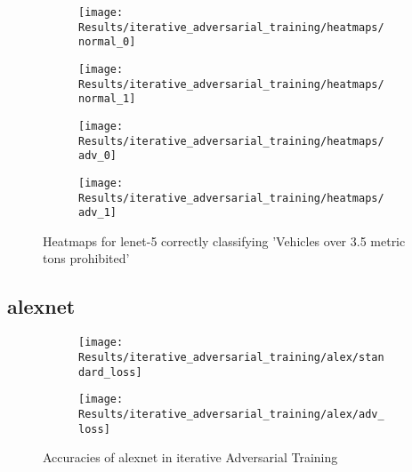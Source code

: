 \documentclass[draft,final]{vutinfth} %
\begin{document}
\begin{figure}[h]
	\begin{subfigure}[b]{0.5\columnwidth}
		\centering
    \texttt{[image: Results/iterative\_adversarial\_training/heatmaps/normal\_0]}
    \label{fig:exp:iat:lenet-5-heat:normal_0}
  \end{subfigure}
  \begin{subfigure}[b]{0.5\columnwidth}
		\centering
    \texttt{[image: Results/iterative\_adversarial\_training/heatmaps/normal\_1]}
    \label{fig:exp:iat:lenet-5-heat:normal_1}
  \end{subfigure}

	\begin{subfigure}[b]{0.5\columnwidth}
		\centering
    \texttt{[image: Results/iterative\_adversarial\_training/heatmaps/adv\_0]}
    \label{fig:exp:iat:lenet-5-heat:adv_0}
  \end{subfigure}
  \begin{subfigure}[b]{0.5\columnwidth}
		\centering
    \texttt{[image: Results/iterative\_adversarial\_training/heatmaps/adv\_1]}
    \label{fig:exp:iat:lenet-5-heat:adv_1}
  \end{subfigure}
  \caption{Heatmaps for lenet-5 correctly classifying 'Vehicles over 3.5 metric tons prohibited'}
	\label{fig:exp:iat:heatmap}
\end{figure}

\FloatBarrier

\subsection{alexnet}

\begin{figure}[h]
  \begin{subfigure}[b]{0.5\columnwidth}
		\centering
    \texttt{[image: Results/iterative\_adversarial\_training/alex/standard\_loss]}
    \label{fig:exp:iat:alex:data}
  \end{subfigure}
  \begin{subfigure}[b]{0.5\columnwidth}
		\centering
    \texttt{[image: Results/iterative\_adversarial\_training/alex/adv\_loss]}
    \label{fig:exp:iat:alex:loss}
  \end{subfigure}
  \caption{Accuracies of alexnet in iterative Adversarial Training}
\end{figure}
\end{document}
